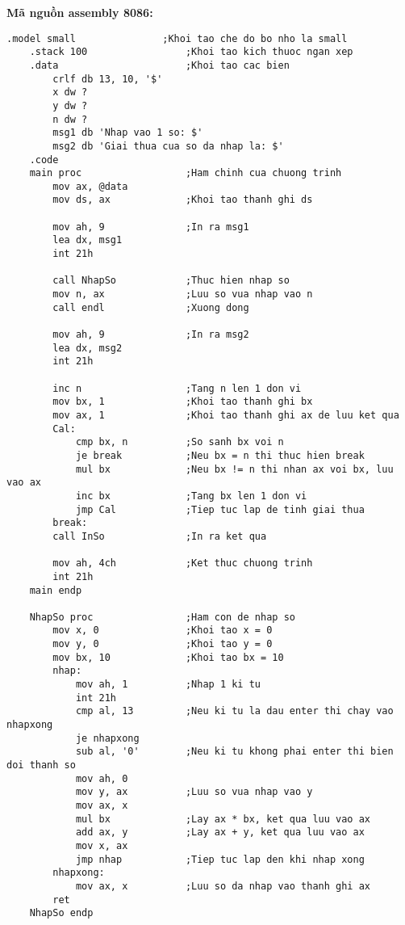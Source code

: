 \vspace{0.5cm}
\noindent\textbf{\large Mã nguồn assembly 8086:}
\begin{lstlisting}[style=asm, caption={Mã nguồn câu 1}]
    .model small               ;Khoi tao che do bo nho la small
    .stack 100                 ;Khoi tao kich thuoc ngan xep
    .data                      ;Khoi tao cac bien
        crlf db 13, 10, '$'      
        x dw ?
        y dw ? 
        n dw ? 
        msg1 db 'Nhap vao 1 so: $'
        msg2 db 'Giai thua cua so da nhap la: $'
    .code
    main proc                  ;Ham chinh cua chuong trinh
        mov ax, @data
        mov ds, ax             ;Khoi tao thanh ghi ds
        
        mov ah, 9              ;In ra msg1
        lea dx, msg1
        int 21h
        
        call NhapSo            ;Thuc hien nhap so
        mov n, ax              ;Luu so vua nhap vao n
        call endl              ;Xuong dong
        
        mov ah, 9              ;In ra msg2
        lea dx, msg2
        int 21h
        
        inc n                  ;Tang n len 1 don vi
        mov bx, 1              ;Khoi tao thanh ghi bx
        mov ax, 1              ;Khoi tao thanh ghi ax de luu ket qua
        Cal:
            cmp bx, n          ;So sanh bx voi n
            je break           ;Neu bx = n thi thuc hien break
            mul bx             ;Neu bx != n thi nhan ax voi bx, luu vao ax
            inc bx             ;Tang bx len 1 don vi
            jmp Cal            ;Tiep tuc lap de tinh giai thua
        break:
        call InSo              ;In ra ket qua
        
        mov ah, 4ch            ;Ket thuc chuong trinh
        int 21h
    main endp 
    
    NhapSo proc                ;Ham con de nhap so
        mov x, 0               ;Khoi tao x = 0
        mov y, 0               ;Khoi tao y = 0
        mov bx, 10             ;Khoi tao bx = 10
        nhap:   
            mov ah, 1          ;Nhap 1 ki tu
            int 21h 
            cmp al, 13         ;Neu ki tu la dau enter thi chay vao nhapxong
            je nhapxong
            sub al, '0'        ;Neu ki tu khong phai enter thi bien doi thanh so
            mov ah, 0
            mov y, ax          ;Luu so vua nhap vao y
            mov ax, x
            mul bx             ;Lay ax * bx, ket qua luu vao ax
            add ax, y          ;Lay ax + y, ket qua luu vao ax
            mov x, ax          
            jmp nhap           ;Tiep tuc lap den khi nhap xong
        nhapxong:
            mov ax, x          ;Luu so da nhap vao thanh ghi ax
        ret
    NhapSo endp 
    

\end{lstlisting}
